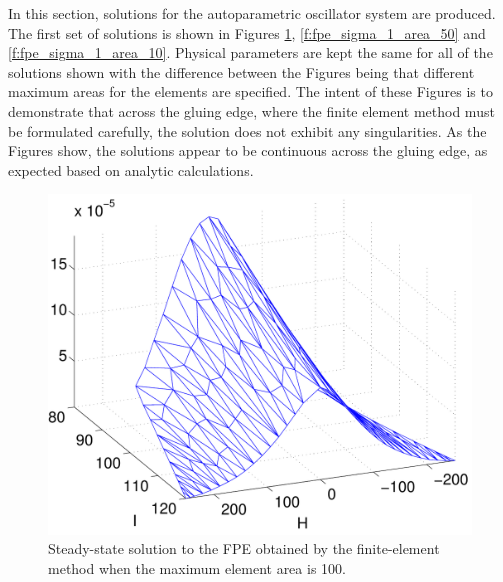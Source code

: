 

In this section, solutions for the autoparametric oscillator system are produced. The first set of solutions is shown in Figures \ref{f:fpe_sigma_1_area_100}, \ref{f:fpe_sigma_1_area_50} and \ref{f:fpe_sigma_1_area_10}. Physical parameters are kept the same for all of the solutions shown with the difference between the Figures being that different maximum areas for the elements are specified. The intent of these Figures is to demonstrate that across the gluing edge, where the finite element method must be formulated carefully, the solution does not exhibit any singularities. As the Figures show, the solutions appear to be continuous across the gluing edge, as expected based on analytic calculations.

\begin{figure}
\begin{center}
\includegraphics[width=\textwidth]{figures/fpe_solution_sigma_1_area_100}
\caption{Steady-state solution to the FPE obtained by the finite-element method when the maximum element area is 100.}
\label{f:fpe_sigma_1_area_100}
\end{center}
\end{figure}

